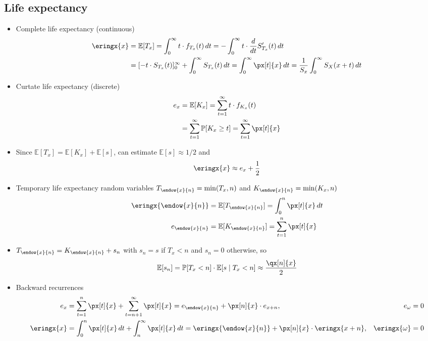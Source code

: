 \subsection{Life expectancy}

\begin{itemize}
\item Complete life expectancy (continuous)
\begin{align*}
\eringx{x} &= \mathbb{E}[T_x] = \int_0^{\infty} t\cdot f_{T_x}(t)\,dt = -\int_0^{\infty} t\cdot\frac{d}{dt}S_{T_x}'(t)\,dt \\
&= [-t\cdot S_{T_x}(t)]_0^{\infty} + \int_0^{\infty} S_{T_x}(t)\,dt = \int_0^{\infty} \px[t]{x}\,dt = \frac{1}{S_x}\int_0^{\infty} S_X(x + t)\,dt
\end{align*}
\item Curtate life expectancy (discrete)
\begin{align*}
e_x &= \mathbb{E}[K_x] = \sum_{t = 1}^{\infty} t\cdot f_{K_x}(t) \\
&= \sum_{t = 1}^{\infty}\mathbb{P}[K_x\geq t] = \sum_{t = 1}^{\infty} \px[t]{x}
\end{align*}
\item Since $\mathbb{E}[T_x] = \mathbb{E}[K_x] + \mathbb{E}[s]$, can estimate $\mathbb{E}[s]\approx 1/2$ and
\begin{equation*}
\eringx{x}\approx e_x + \frac{1}{2}
\end{equation*}
\item Temporary life expectancy random variables $T_{\endow{x}{n}} = \min(T_x,n)$ and $K_{\endow{x}{n}} = \min(K_x,n)$
\begin{align*}
\eringx{\endow{x}{n}} &= \mathbb{E}[T_{\endow{x}{n}}] = \int_0^n \px[t]{x}\,dt \\
e_{\endow{x}{n}} &= \mathbb{E}[K_{\endow{x}{n}}] = \sum_{t = 1}^n \px[t]{x}
\end{align*}
\item $T_{\endow{x}{n}} = K_{\endow{x}{n}} + s_n$ with $s_n = s$ if $T_x < n$ and $s_n = 0$ otherwise, so
\begin{equation*}
\mathbb{E}[s_n] = \mathbb{P}[T_x < n]\cdot\mathbb{E}[s\mid T_x < n]\approx\frac{\qx[n]{x}}{2}
\end{equation*}
\item Backward recurrences
\begin{align*}
e_x &= \sum_{t = 1}^n \px[t]{x} + \sum_{t = n + 1}^{\infty} \px[t]{x} = e_{\endow{x}{n}} + \px[n]{x}\cdot e_{x + n}, & e_{\omega} &= 0 \\
\eringx{x} &= \int_0^n \px[t]{x}\,dt + \int_n^{\infty} \px[t]{x}\,dt = \eringx{\endow{x}{n}} + \px[n]{x}\cdot\eringx{x + n}, & \eringx{\omega} &= 0
\end{align*}
\end{itemize}